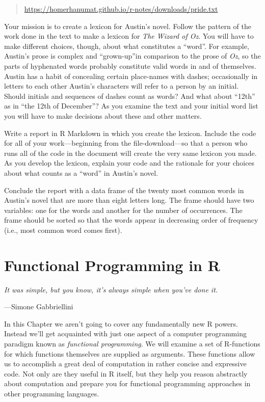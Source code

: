 \documentclass[]{book}
\theoremstyle{definition}
\theoremstyle{definition}
\theoremstyle{remark}
\let\BeginKnitrBlock\begin \let\EndKnitrBlock\end
\begin{document}
{\begin{enumerate}
  \begin{quote}
  \url{https://homerhanumat.github.io/r-notes/downloads/pride.txt}
  \end{quote}

  Your mission is to create a lexicon for Austin's novel. Follow the
  pattern of the work done in the text to make a lexicon for \emph{The
  Wizard of Oz}. You will have to make different choices, though, about
  what constitutes a ``word''. For example, Austin's prose is complex
  and ``grown-up''in comparison to the prose of \emph{Oz}, so the parts
  of hyphenated words probably constitute valid words in and of
  themselves. Austin has a habit of concealing certain place-names with
  dashes; occasionally in letters to each other Austin's characters will
  refer to a person by an initial. Should initials and sequences of
  dashes count as words? And what about ``12th'' as in ``the 12th of
  December''? As you examine the text and your initial word list you
  will have to make decisions about these and other matters.

  Write a report in R Markdown in which you create the lexicon. Include
  the code for all of your work---beginning from the file-download---so
  that a person who runs all of the code in the document will create the
  very same lexicon you made. As you develop the lexicon, explain your
  code and the rationale for your choices about what counts as a
  ``word'' in Austin's novel.

  Conclude the report with a data frame of the twenty most common words
  in Austin's novel that are more than eight letters long. The frame
  should have two variables: one for the words and another for the
  number of occurrences. The frame should be sorted so that the words
  appear in decreasing order of frequency (i.e., most common word comes
  first).
\end{enumerate}

\chapter{Functional Programming in R}\label{functional}

\BeginKnitrBlock{leadquote}
\emph{It was simple, but you know, it's always simple when you've done
it.}

---Simone Gabbriellini
\EndKnitrBlock{leadquote}

In this Chapter we aren't going to cover any fundamentally new R powers.
Instead we'll get acquainted with just one aspect of a computer
programming paradigm known as \emph{functional programming}. We will
examine a set of R-functions for which functions themselves are supplied
as arguments. These functions allow us to accomplish a great deal of
computation in rather concise and expressive code. Not only are they
useful in R itself, but they help you reason abstractly about
computation and prepare you for functional programming approaches in
other programming languages.

}
\end{document}
